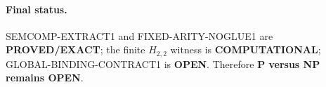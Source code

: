 \documentclass[11pt]{article}
\newcommand{\status}[1]{\textbf{#1}}
\begin{document}
\paragraph{Final status.}
SEMCOMP-EXTRACT1 and FIXED-ARITY-NOGLUE1 are \status{PROVED/EXACT}; the finite $H_{2,2}$ witness is \status{COMPUTATIONAL}; GLOBAL-BINDING-CONTRACT1 is \status{OPEN}.  Therefore \textbf{P versus NP remains OPEN}.

\end{document}

